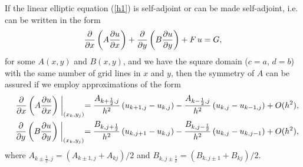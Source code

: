 \vskip 0.3cm
 
If the linear elliptic equation (\ref{h1}) is self-adjoint or can be made
self-adjoint, i.e. can be written in the form
\[
\frac{{\partial} }{{\partial} x}\left(A\frac{{\partial} u}{{\partial} x}\right)+
\frac{{\partial} }{{\partial} y}\left(B\frac{{\partial} u}{{\partial} y}\right)
+F \, u = G,
\]
for some $A(x,y)$ and $B(x,y)$, and we have the square domain ($c=a$, $d=b$) with the same number of grid lines in $x$ and
$y$, then the symmetry of $A$ can be assured if we employ approximations of the form
\begin{eqnarray}
&&\frac{{\partial} }{{\partial} x}\left(A\frac{{\partial} u}{{\partial} x}\right)\biggm\vert_{(x_{k},y_{j})}=
\frac{A_{k+\frac{1}{2},j}}{h^2}\left(u_{k+1,j}-u_{k,j}\right)-
\frac{A_{k-\frac{1}{2},j}}{h^2}\left(u_{k,j}-u_{k-1,j}\right)+O(h^2), \nonumber \\
&&\frac{{\partial} }{{\partial} y}\left(B\frac{{\partial} u}{{\partial} y}\right)\biggm\vert_{(x_{k},y_{j})}=
\frac{B_{k,j+\frac{1}{2}}}{h^2}\left(u_{k,j+1}-u_{k,j}\right)-
\frac{B_{k,j-\frac{1}{2}}}{h^2}\left(u_{k,j}-u_{k,j-1}\right)+O(h^2), \nonumber
\end{eqnarray}
where $A_{k\pm\frac{1}{2},j}=(A_{k\pm 1,j}+A_{kj})/2$ and
$B_{k,j\pm\frac{1}{2}}=(B_{k,j\pm 1}+B_{kj})/2$.






